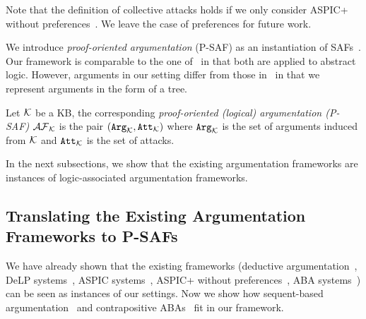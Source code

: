 \begin{remark}
    Note that the definition of collective attacks holds if we only consider ASPIC+ without preferences~\cite{ModgilP14}. We leave the case of preferences for future work.
\end{remark}

We introduce \emph{proof-oriented argumentation} (P-SAF) as an instantiation of SAFs~\cite{Nielsen2007}. Our framework is comparable to the one of~\cite{loanho_2024} in that both are applied to abstract logic. However, arguments in our setting differ from those in~\cite{loanho_2024} in that we represent arguments in the form of a tree.

\begin{definition} \label{def:ab-af} Let $ \mathcal{K}$ be a KB, the corresponding \emph{proof-oriented (logical) argumentation (P-SAF)} $\mathcal{AF}_{\mathcal{K}}$ is the pair $(\texttt{\textup{Arg}}_{\mathcal{K}}, \texttt{\textup{Att}}_{\mathcal{K}})$ where $\texttt{\textup{Arg}}_{\mathcal{K}}$ is the set of arguments induced from $ \mathcal{K}$ and $\texttt{\textup{Att}}_{\mathcal{K}}$ is the set of attacks.
\end{definition}


In the next subsections, we show that the existing argumentation frameworks are instances of logic-associated argumentation frameworks.

\subsection{Translating the Existing Argumentation Frameworks to P-SAFs}
\label{subsec:relation-framework}

We have already shown that the existing frameworks (deductive argumentation~\cite{BesnardH01,ZhangL13,ARIOUA201776}, DeLP systems~\cite{Alejandro2014},  ASPIC systems~\cite{Prakken2002}, ASPIC+ without preferences~\cite{ModgilP14}, ABA systems~\cite{Dung2009,DimopoulosD0R0W24,Rapberger2024,Lehtonen2024}) can be seen as instances of our settings. Now we show how sequent-based argumentation~\cite{ArieliS19,BorgAS17} and contrapositive ABAs~\cite{HEYNINCK2020103,ArieliH24} fit in our framework.


